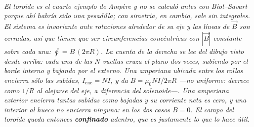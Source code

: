 \begin{center}
\begin{tikzpicture}[scale=1]
\end{tikzpicture}\\[0.5em]
{\small\itshape El toroide es el cuarto ejemplo de Ampère y no se calculó antes
con Biot--Savart porque ahí habría sido una pesadilla; con simetría, en cambio,
sale sin integrales. El sistema es invariante ante rotaciones alrededor de su
eje y las líneas de $\vec B$ son cerradas, así que tienen que ser
circunferencias concéntricas con $|\vec B|$ constante sobre cada una:
$\oint = B\,(2\pi R)$. La cuenta de la derecha se lee del dibujo visto desde
arriba: cada una de las $N$ vueltas cruza el plano dos veces, subiendo por el
borde interno y bajando por el externo. Una amperiana ubicada entre los rollos
encierra sólo las subidas, $I_{\text{enc}} = NI$, y da
$B = \mu_0 N I/2\pi R$ ---no uniforme: decrece como $1/R$ al alejarse del eje,
a diferencia del solenoide---. Una amperiana exterior encierra tantas subidas
como bajadas y su corriente neta es cero, y una interior al hueco no encierra
ninguna: en los dos casos $B=0$. El campo del toroide queda entonces
\textbf{confinado} adentro, que es justamente lo que lo hace útil.}
\end{center}
